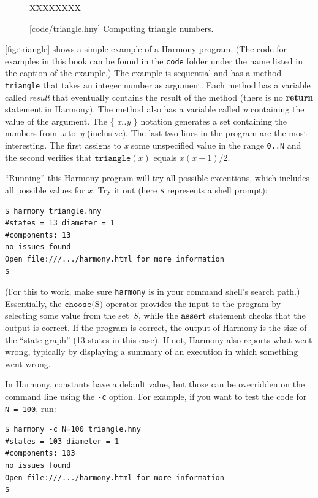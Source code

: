 \documentclass{report}
\newcommand{\harmonysource}[1]{
\begin{tabbing}
XX\=XXX\=XXX\kill
    
\end{tabbing}
}
\newcommand{\harmonylink}[1]{%
[\href{https://www.cs.cornell.edu/home/rvr/harmony/#1}{\underline{#1}}]%
}
\newenvironment{code}{
\tcolorbox
}{
\endtcolorbox
}
\begin{document}
\begin{figure}
\begin{code}
\harmonysource{triangle}
\end{code}
\caption{\harmonylink{code/triangle.hny} Computing triangle numbers.}
\label{fig:triangle}
\end{figure}

\autoref{fig:triangle} shows a simple example of a Harmony program.
(The code for examples in this book can be found in the \texttt{code} folder under
the name listed in the caption of the example.)
The example is sequential and has a method \texttt{triangle} that takes
an integer number as argument.  Each method has a variable called
\textit{result} that eventually contains the result of the
method (there is no \textbf{return} statement in Harmony).  The method
also has a variable called \textit{n} containing the value of the
argument.  The \{ \textit{x..y} \} notation generates a set containing the numbers
from~\textit{x} to~\textit{y} (inclusive).  The last two lines in the program are
the most interesting.
The first assigns to \textit{x} some unspecified value in the range \texttt{0..N}
and the second verifies that $\mathtt{triangle}(x)$ equals $x(x+1)/2$.

``Running'' this Harmony program will try all possible executions, which
includes all possible values for $x$.  Try it out (here \texttt{\$}
represents a shell prompt):

\begin{code}
\begin{verbatim}
$ harmony triangle.hny
#states = 13 diameter = 1
#components: 13
no issues found
Open file:///.../harmony.html for more information
$
\end{verbatim}
\end{code}

(For this to work, make sure \texttt{harmony} is in your command shell's search path.)
Essentially, the $\texttt{choose}($S$)$
%
operator provides the input to the program by selecting some value from the
set~$S$, while the $\textbf{assert}$ statement checks that the output is
correct.  If the program is correct, the output of Harmony is the size of the
``state graph'' (13 states in this case).  If not, Harmony also
reports what went wrong, typically by displaying a summary of an execution in
which something went wrong.

In Harmony, constants have a default value,
but those can be overridden on the command
line using the \texttt{-c} option.
%
For example, if you want to test the code for \texttt{N = 100}, run:
\begin{code}
\begin{verbatim}
$ harmony -c N=100 triangle.hny
#states = 103 diameter = 1
#components: 103
no issues found
Open file:///.../harmony.html for more information
$
\end{verbatim}
\end{code}
\end{document}
